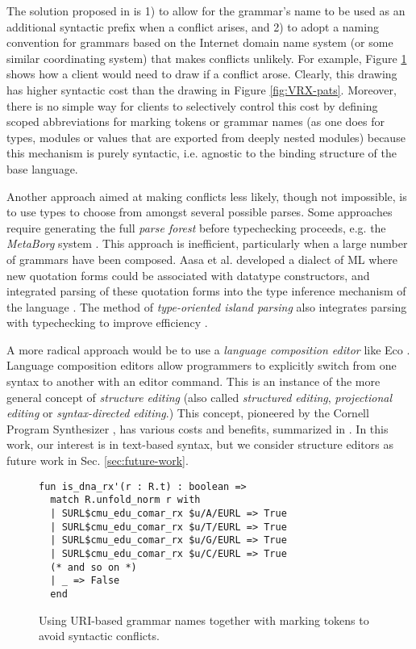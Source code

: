 {The solution proposed in \cite{conf/pldi/SchwerdfegerW09} is 1) to allow for the grammar's name to be used as an additional syntactic prefix when a conflict arises, and 2) to adopt a naming convention for grammars  based on the Internet domain name system (or some similar coordinating system) that makes conflicts unlikely. For example, Figure \ref{fig:vanwyk} shows how a client would need to draw  if a conflict arose. Clearly, this drawing has higher syntactic cost than the drawing in Figure \ref{fig:VRX-pats}. Moreover, there is no simple way for clients to selectively control this cost by defining scoped abbreviations for marking tokens or grammar names (as one does for types, modules or values that are exported from deeply nested modules) because this mechanism is purely syntactic, i.e. agnostic to the binding structure of the base language.

Another approach aimed at making conflicts less likely, though not impossible, is to use types to choose from amongst several possible parses. Some approaches require generating the full \emph{parse forest} before typechecking proceeds, e.g. the \emph{MetaBorg} system \cite{bravenboer2005generalized}. This approach is inefficient, particularly when a large number of grammars have been composed. Aasa et al. developed a dialect of ML where new quotation forms could be associated with datatype constructors, and integrated parsing of these quotation forms into the type inference mechanism of the language \cite{DBLP:conf/lfp/AasaPS88}. The method of \emph{type-oriented island parsing} also integrates parsing with typechecking to improve efficiency \cite{DBLP:conf/sfp/SilkensenS12}.

A more radical approach would be to use a \emph{language composition editor} like Eco \cite{diekmann2014eco}. Language composition editors allow programmers to explicitly switch from one syntax to another with an editor command. This is an instance of the more general concept of \emph{structure editing} (also called \emph{structured editing}, \emph{projectional editing} or \emph{syntax-directed editing}.) This concept, pioneered by the Cornell Program Synthesizer \cite{teitelbaum_cornell_1981}, has various costs and benefits, summarized in \cite{DBLP:conf/sle/VolterSBK14}. In this work, our interest is in text-based syntax, but we consider structure editors as future work in Sec. \ref{sec:future-work}.

\begin{figure}
\begin{lstlisting}[numbers=none]
fun is_dna_rx'(r : R.t) : boolean => 
  match R.unfold_norm r with 
  | SURL$cmu_edu_comar_rx $u/A/EURL => True 
  | SURL$cmu_edu_comar_rx $u/T/EURL => True
  | SURL$cmu_edu_comar_rx $u/G/EURL => True
  | SURL$cmu_edu_comar_rx $u/C/EURL => True
  (* and so on *)
  | _ => False
  end
\end{lstlisting}
\caption{Using URI-based grammar names together with marking tokens to avoid syntactic conflicts.}
\label{fig:vanwyk}
\end{figure}
}
